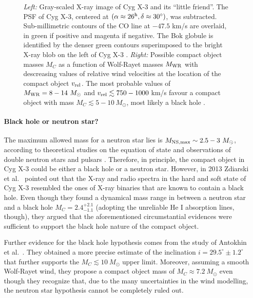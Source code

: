 \documentclass[a4paper,titlepage]{book}     	%
\newcommand{\sun}{\ensuremath{_\odot}}
\newcommand{\msun}{\ensuremath{M\sun}}
\newcommand{\mwr}{\ensuremath{M_\textup{WR}}}
\begin{document}
\begin{figure}[t!]
\begin{minipage}{.49\textwidth}
	\end{minipage}
	\caption{\emph{Left:} Gray-scaled X-ray image of Cyg X-3 and its ``little friend''. The PSF of Cyg X-3, centered at $(\alpha \approx 26^{\rm h}, \delta \approx 30^{\circ})$, was subtracted. Sub-millimetric contours of the CO line at $-47.5$ km/s are overlaid, in green if positive and magenta if negative. The Bok globule is identified by the denser green contours superimposed to the bright X-ray blob on the left of Cyg X-3 \cite{CygX-3_McCollough2016_Observation}. \emph{Right:} Possible compact object masses $M_C$ as a function of Wolf-Rayet masses $\mwr$ with descreasing values of relative wind velocities at the location of the compact object $v_{\rm rel}$. The most probable values of $\mwr = 8-14~\msun$ and $v_{\rm rel} \lesssim 750-1000$ km/s favour a compact object with mass $M_C \lesssim 5-10~\msun$, most likely a black hole \cite{CygX-3_Koljonen2017}.}\label{fig:CygX3}
\end{figure}

\paragraph{Black hole or neutron star?}
The maximum allowed mass for a neutron star lies is $M_{\rm NS,max}\sim 2.5-3~\msun$, according to theoretical studies on the equation of state and observations of double neutron stars and pulsars \cite{NSreview}. Therefore, in principle, the compact object in Cyg X-3 could be either a black hole or a neutron star. However, in 2013 Zdiarski et al.\ \cite{Cyg-X3_Zd2013} pointed out that the X-ray and radio spectra in the hard and soft state of Cyg X-3 resembled the ones of X-ray binaries that are known to contain a black hole. Even though they found a dynamical mass range in between a neutron star and a black hole $M_C = 2.4_{-1.1}^{+2.1}$ (adopting the unreliable He I absorption lines, though), they argued that the aforementioned circumstantial evidences were sufficient to support the black hole nature of the compact object. 

Further evidence for the black hole hypothesis comes from the  study of Antokhin et al.\ \cite{CygX-3_Antokhin2022}. They obtained a more precise estimate of the inclination $i = 29.5^{\circ} \pm 1.2^{\circ}$ that further supports the $M_C \lesssim 10~\msun$ upper limit. Moreover, assuming a smooth Wolf-Rayet wind, they propose a compact object mass of $M_C \approx 7.2~\msun $ even  though they recognize that, due to the many uncertainties in the wind modelling, the neutron star hypothesis cannot be completely ruled out.
\end{document}
